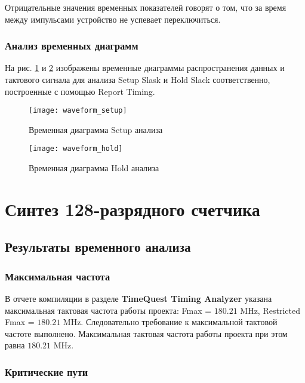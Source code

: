 Отрицательные значения временных показателей говорят о том, что за время между импульсами устройство не успевает переключиться.

\subsubsection{Анализ временных диаграмм}

На рис. \ref{fig:waveform_setup} и \ref{fig:waveform_hold} изображены временные диаграммы распространения данных и тактового сигнала для анализа Setup Slask и Hold Slack соответственно, построенные с помощью Report Timing.

\begin{figure}[H]
\begin{center}
	\texttt{[image: waveform\_setup]}
	\caption{Временная диаграмма Setup анализа}
	\label{fig:waveform_setup}
\end{center}
\end{figure}

\vspace{-1.5cm}
\begin{figure}[H]
\begin{center}
	\texttt{[image: waveform\_hold]}
	\caption{Временная диаграмма Hold анализа}
	\label{fig:waveform_hold}
\end{center}
\end{figure}

\section{Синтез 128-разрядного счетчика}

\subsection{Результаты временного анализа}

\subsubsection{Максимальная частота}

В отчете компиляции в разделе \textbf{TimeQuest Timing Analyzer} указана максимальная тактовая частота работы проекта: Fmax = $180.21$ MHz, Restricted Fmax = $180.21$ MHz. Следовательно требование к максимальной тактовой частоте выполнено. Максимальная тактовая частота работы проекта при этом равна $180.21$ MHz. 

\subsubsection{Критические пути}

